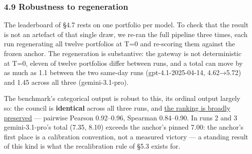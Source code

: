 \subsubsection{4.9 Robustness to regeneration}\label{robustness-to-regeneration}

The leaderboard of §4.7 rests on one portfolio per model. To check that the result is not an artefact of that single draw, we re-ran the full pipeline three times, each run regenerating all twelve portfolios at T=0 and re-scoring them against the frozen anchor. The regeneration is substantive: the gateway is not deterministic at T=0, eleven of twelve portfolios differ between runs, and a total can move by as much as 1.1 between the two same-day runs (gpt-4.1-2025-04-14, 4.62→5.72) and 1.45 across all three (gemini-3.1-pro).

The benchmark's categorical output is robust to this, its ordinal output largely so: the council is \textbf{identical} across all three runs, and \hyperref[tab-reruns]{the ranking is broadly preserved} --- pairwise Pearson 0.92--0.96, Spearman 0.84--0.90. In runs 2 and 3 gemini-3.1-pro's total (7.35, 8.10) exceeds the anchor's pinned 7.00: the anchor's first place is a calibration convention, not a measured victory --- a standing result of this kind is what the recalibration rule of §5.3 exists for.

\protect{}\label{tab-reruns}{}

